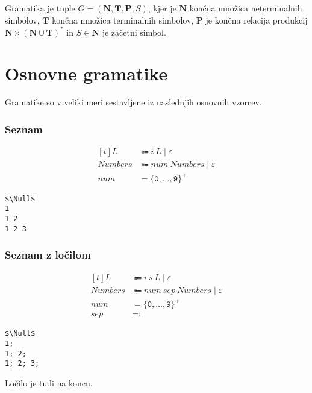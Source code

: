 \documentclass{report}
\newcommand{\Null}{\varepsilon}
\newcommand{\Char}[1]{\texttt{#1}}
\newcommand{\Spc}{\ }
\newcommand{\Union}{\mathrel{|}}
\newcommand{\Kleene}[1]{{#1}^\ast}
\newcommand{\KleenePlus}[1]{#1^+}
\newcommand{\Set}[1]{\symbf{#1}}
\newcommand{\Terminals}{\Set{T}}
\newcommand{\Productions}{\Set{P}}
\newcommand{\NonTerminals}{\Set{N}}
\newcommand{\Arrow}{\Coloneq}
\newcommand{\NT}[1]{{#1}}
\newcommand{\T}[1]{{#1}}
\begin{document}
Gramatika je tuple $G = (\NonTerminals, \Terminals, \Productions, \NT{S})$, kjer je $\NonTerminals$ končna množica neterminalnih simbolov, $\Terminals$ končna množica terminalnih simbolov, $\Productions$ je končna relacija produkcij $\NonTerminals \times \Kleene{(\NonTerminals \cup \Terminals)}$ in $\NT{S} \in \NonTerminals$ je začetni simbol.

\section{Osnovne gramatike}
Gramatike so v veliki meri sestavljene iz naslednjih osnovnih vzorcev.

\subsubsection{Seznam}
\begin{equation*}
  \begin{aligned}[t]
    \NT{L} &\Arrow \T{i} \Spc \NT{L} \Union \Null\\[1em]
    \NT{Numbers} &\Arrow \T{num} \Spc \NT{Numbers} \Union \Null\\[1em]
    \T{num} &= \KleenePlus{\{\Char{0}, \dots, \Char{9}\}}
  \end{aligned}
\end{equation*}
\begin{lstlisting}
$\Null$
1
1 2
1 2 3
\end{lstlisting}

\subsubsection{Seznam z ločilom}
\begin{equation*}
  \begin{aligned}[t]
    \NT{L} &\Arrow \T{i} \Spc \T{s} \Spc \NT{L} \Union \Null\\[1em]
    \NT{Numbers} &\Arrow \T{num} \Spc \T{sep} \Spc \NT{Numbers} \Union \Null\\[1em]
    \T{num} &= \KleenePlus{\{\Char{0}, \dots, \Char{9}\}}\\
    \T{sep} &= \Char{;}
  \end{aligned}
\end{equation*}
\begin{lstlisting}
$\Null$
1;
1; 2;
1; 2; 3;
\end{lstlisting}
Ločilo je tudi na koncu.
\end{document}
